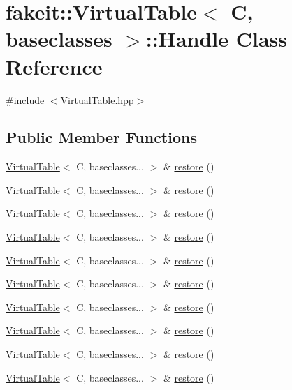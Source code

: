\hypertarget{classfakeit_1_1VirtualTable_1_1Handle}{}\section{fakeit\+::Virtual\+Table$<$ C, baseclasses $>$\+::Handle Class Reference}
\label{classfakeit_1_1VirtualTable_1_1Handle}


{\ttfamily \#include $<$Virtual\+Table.\+hpp$>$}

\subsection*{Public Member Functions}
\begin{DoxyCompactItemize}
\item 
\mbox{\hyperlink{structfakeit_1_1VirtualTable}{Virtual\+Table}}$<$ C, baseclasses... $>$ \& \mbox{\hyperlink{classfakeit_1_1VirtualTable_1_1Handle_a7699fad7498aa96410a3657085100b39}{restore}} ()
\item 
\mbox{\hyperlink{structfakeit_1_1VirtualTable}{Virtual\+Table}}$<$ C, baseclasses... $>$ \& \mbox{\hyperlink{classfakeit_1_1VirtualTable_1_1Handle_a7699fad7498aa96410a3657085100b39}{restore}} ()
\item 
\mbox{\hyperlink{structfakeit_1_1VirtualTable}{Virtual\+Table}}$<$ C, baseclasses... $>$ \& \mbox{\hyperlink{classfakeit_1_1VirtualTable_1_1Handle_a7699fad7498aa96410a3657085100b39}{restore}} ()
\item 
\mbox{\hyperlink{structfakeit_1_1VirtualTable}{Virtual\+Table}}$<$ C, baseclasses... $>$ \& \mbox{\hyperlink{classfakeit_1_1VirtualTable_1_1Handle_a7699fad7498aa96410a3657085100b39}{restore}} ()
\item 
\mbox{\hyperlink{structfakeit_1_1VirtualTable}{Virtual\+Table}}$<$ C, baseclasses... $>$ \& \mbox{\hyperlink{classfakeit_1_1VirtualTable_1_1Handle_a7699fad7498aa96410a3657085100b39}{restore}} ()
\item 
\mbox{\hyperlink{structfakeit_1_1VirtualTable}{Virtual\+Table}}$<$ C, baseclasses... $>$ \& \mbox{\hyperlink{classfakeit_1_1VirtualTable_1_1Handle_a7699fad7498aa96410a3657085100b39}{restore}} ()
\item 
\mbox{\hyperlink{structfakeit_1_1VirtualTable}{Virtual\+Table}}$<$ C, baseclasses... $>$ \& \mbox{\hyperlink{classfakeit_1_1VirtualTable_1_1Handle_a7699fad7498aa96410a3657085100b39}{restore}} ()
\item 
\mbox{\hyperlink{structfakeit_1_1VirtualTable}{Virtual\+Table}}$<$ C, baseclasses... $>$ \& \mbox{\hyperlink{classfakeit_1_1VirtualTable_1_1Handle_a7699fad7498aa96410a3657085100b39}{restore}} ()
\item 
\mbox{\hyperlink{structfakeit_1_1VirtualTable}{Virtual\+Table}}$<$ C, baseclasses... $>$ \& \mbox{\hyperlink{classfakeit_1_1VirtualTable_1_1Handle_a7699fad7498aa96410a3657085100b39}{restore}} ()
\item 
\mbox{\hyperlink{structfakeit_1_1VirtualTable}{Virtual\+Table}}$<$ C, baseclasses... $>$ \& \mbox{\hyperlink{classfakeit_1_1VirtualTable_1_1Handle_a7699fad7498aa96410a3657085100b39}{restore}} ()
\end{DoxyCompactItemize}
